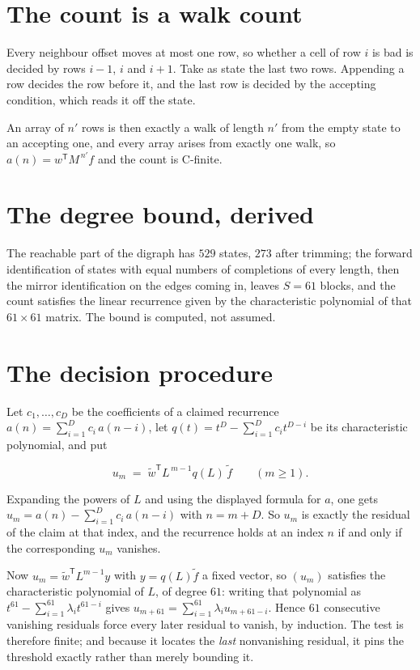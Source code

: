 \documentclass[11pt]{article}
\theoremstyle{definition}
\begin{document}
\section{The count is a walk count}

Every neighbour offset moves at most one row, so whether a cell of row $i$ is bad is decided by rows $i-1$, $i$ and $i+1$. Take as state the last two rows. Appending a row decides the row before it, and the last row is decided by the accepting condition, which reads it off the state.

An array of $n'$ rows is then exactly a walk of length $n'$ from the empty state to an accepting one, and every array arises from exactly one walk, so $a(n) = w^{\mathsf T}M^{\,n'}f$ and the count is C-finite.

\section{The degree bound, derived}

The reachable part of the digraph has $529$ states, $273$ after trimming; the forward identification of states with equal numbers of completions of every length, then the mirror identification on the edges coming in, leaves $S = 61$ blocks, and the count satisfies the linear recurrence given by the characteristic polynomial of that $61\times61$ matrix. The bound is computed, not assumed.

\section{The decision procedure}

Let $c_1,\dots,c_D$ be the coefficients of a claimed recurrence $a(n) = \sum_{i=1}^{D} c_i\,a(n-i)$, let $q(t) = t^{D} - \sum_{i=1}^{D} c_i t^{D-i}$ be its characteristic polynomial, and put

\[u_m \;=\; \tilde w^{\mathsf T} L^{\,m-1} q(L)\,\tilde f \qquad (m \ge 1).\]

Expanding the powers of $L$ and using the displayed formula for $a$, one gets $u_m = a(n) - \sum_{i=1}^{D} c_i\,a(n-i)$ with $n = m + D$. So $u_m$ is exactly the residual of the claim at that index, and the recurrence holds at an index $n$ if and only if the corresponding $u_m$ vanishes.

Now $u_m = \tilde w^{\mathsf T} L^{m-1} y$ with $y = q(L)\tilde f$ a fixed vector, so $(u_m)$ satisfies the characteristic polynomial of $L$, of degree $61$: writing that polynomial as $t^{61} - \sum_{i=1}^{61} \lambda_i t^{61-i}$ gives $u_{m+61} = \sum_{i=1}^{61} \lambda_i u_{m+61-i}$. Hence $61$ consecutive vanishing residuals force every later residual to vanish, by induction. The test is therefore finite; and because it locates the {\itshape last} nonvanishing residual, it pins the threshold exactly rather than merely bounding it.
\end{document}

